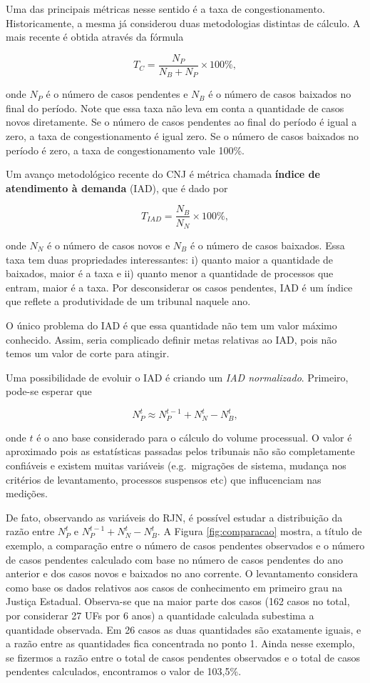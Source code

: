 \documentclass[]{report}
\begin{document}
Uma das principais métricas nesse sentido é a taxa de congestionamento.
Historicamente, a mesma já considerou duas metodologias distintas de
cálculo. A mais recente é obtida através da fórmula

\[
T_C = \frac{N_P}{N_B + N_P} \times 100\%,
\]

onde \(N_P\) é o número de casos pendentes e \(N_B\) é o número de casos
baixados no final do período. Note que essa taxa não leva em conta a
quantidade de casos novos diretamente. Se o número de casos pendentes ao
final do período é igual a zero, a taxa de congestionamento é igual
zero. Se o número de casos baixados no período é zero, a taxa de
congestionamento vale 100\%.

Um avanço metodológico recente do CNJ é métrica chamada \textbf{índice
de atendimento à demanda} (IAD), que é dado por

\[
T_{IAD} = \frac{N_B}{N_N}\times 100\%,
\]

onde \(N_N\) é o número de casos novos e \(N_B\) é o número de casos
baixados. Essa taxa tem duas propriedades interessantes: i) quanto maior
a quantidade de baixados, maior é a taxa e ii) quanto menor a quantidade
de processos que entram, maior é a taxa. Por desconsiderar os casos
pendentes, IAD é um índice que reflete a produtividade de um tribunal
naquele ano.

O único problema do IAD é que essa quantidade não tem um valor máximo
conhecido. Assim, seria complicado definir metas relativas ao IAD, pois
não temos um valor de corte para atingir.

Uma possibilidade de evoluir o IAD é criando um \emph{IAD normalizado}.
Primeiro, pode-se esperar que

\[
N_P^{t} \approx N_P^{t-1} + N_N^{t} - N_B^{t},
\]

onde \(t\) é o ano base considerado para o cálculo do volume processual.
O valor é aproximado pois as estatísticas passadas pelos tribunais não
são completamente confiáveis e existem muitas variáveis (e.g.~migrações
de sistema, mudança nos critérios de levantamento, processos suspensos
etc) que influcenciam nas medições.

De fato, observando as variáveis do RJN, é possível estudar a
distribuição da razão entre \(N_P^t\) e \(N_P^{t-1} + N_N^{t}-N_B^{t}\).
A Figura \ref{fig:comparacao} mostra, a título de exemplo, a comparação
entre o número de casos pendentes observados e o número de casos
pendentes calculado com base no número de casos pendentes do ano
anterior e dos casos novos e baixados no ano corrente. O levantamento
considera como base os dados relativos aos casos de conhecimento em
primeiro grau na Justiça Estadual. Observa-se que na maior parte dos
casos (162 casos no total, por considerar 27 UFs por 6 anos) a
quantidade calculada subestima a quantidade observada. Em 26 casos as
duas quantidades são exatamente iguais, e a razão entre as quantidades
fica concentrada no ponto 1. Ainda nesse exemplo, se fizermos a razão
entre o total de casos pendentes observados e o total de casos pendentes
calculados, encontramos o valor de 103,5\%.
\end{document}
